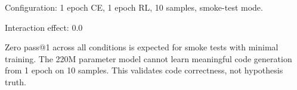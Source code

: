 
Configuration: 1 epoch CE, 1 epoch RL, 10 samples, smoke-test mode.

\begin{table}[htbp]
\centering
{}
\end{table}

Interaction effect: 0.0

Zero pass@1 across all conditions is expected for smoke tests with minimal training. The 220M parameter model cannot learn meaningful code generation from 1 epoch on 10 samples. This validates code correctness, not hypothesis truth.
